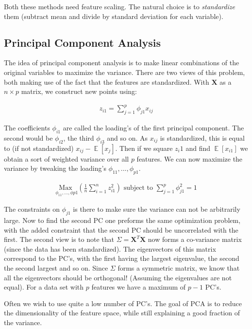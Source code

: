 \documentclass{article}
\renewcommand{\vec}[1]{\mathbf{#1}} %
\DeclareMathOperator*{\E}{\mathbb{E}}
\begin{document}
Both these methods need feature scaling. The natural choice is to \textit{standardize} them (subtract mean and divide by standard deviation for each variable).

\subsection{Principal Component Analysis}
The idea of principal component analysis is to make linear combinations of the original variables to maximize the variance. There are two views of this problem, both making use of the fact that the features are standardized. With $\vec{X}$ as a $n \times p$ matrix, we construct new points using:

\begin{align*}
    z_{i1} = \sum_{j=1}^{p} \phi_{j1}x_{ij}
\end{align*}

The coefficients $\phi_{i1}$ are called the loading's of the first principal component. The second would be $\phi_{i2}$, the third $\phi_{i3}$ and so on. As $x_{ij}$ is standardized, this is equal to (if not standardized) $x_{ij}-\E [x_{j}]$. Then if we square $z_i1$ and find $\E[x_{i1}]$ we obtain a sort of weighted variance over all $p$ features. We can now maximize the variance by tweaking the loading's $\phi_{11},...,\phi_{p1}$.

\begin{align*}
    \underset{\phi_{11},...,\phi{p1}}{\text{Max }} \left(\frac{1}{n}\sum_{i=1}^{n} z_{i1}^2\right) \text{   subject to   } \sum_{j=1}^{p} \phi_{j1}^2 = 1
\end{align*}

The constraints on $\phi_{j1}$ is there to make sure the variance can not be arbitrarily large. Now to find the second PC one preforms the same optimization problem, with the added constraint that the second PC should be uncorrelated with the first. The second view is to note that $\Sigma = \vec{X}^T\vec{X}$ now forms a co-variance matrix (since the data has been standardized). The eigenvectors of this matrix correspond to the PC's, with the first having the largest eigenvalue, the second the second largest and so on. Since $\Sigma$ forms a symmetric matrix, we know that all the eigenvectors should be orthogonal! (Assuming the eigenvalues are not equal). For a data set with $p$ features we have a maximum of $p-1$ PC's.

Often we wish to use quite a low number of PC's. The goal of PCA is to reduce the dimensionality of the feature space, while still explaining a good fraction of the variance.
\end{document}

